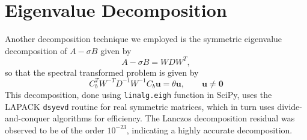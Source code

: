 \section{Eigenvalue Decomposition}
Another decomposition technique we employed is the symmetric eigenvalue decomposition of $A-\sigma B$ given by
\begin{equation}
    A-\sigma B = WDW^T,
\end{equation}
so that the spectral transformed problem is given by
\begin{equation}\label{3.4}
	C_b^T W^{-T}D^{-1}W^{-1} C_b \mathbf{u} = \theta \mathbf{u}, \qquad \mathbf{u} \neq \mathbf{0}
\end{equation}
This decomposition, done using \texttt{linalg.eigh} function in SciPy, uses the LAPACK \texttt{dsyevd} routine for real symmetric matrices, which in turn uses divide-and-conquer algorithms for efficiency. The Lanczos decomposition residual was observed to be of the order $10^{-23}$, indicating a highly accurate decomposition.

